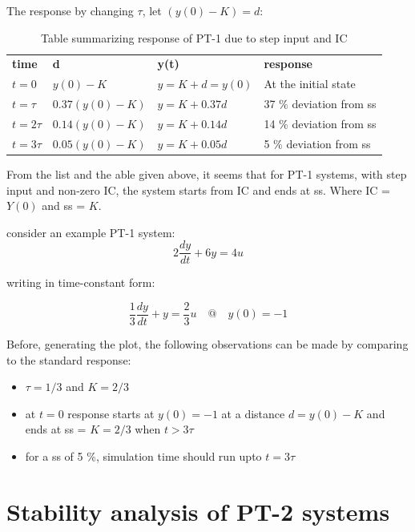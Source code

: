 The response by changing $\tau$, let $(y(0) - K) = d$:

\begin{table}[h!]
	\centering
	\begin{tabular}{m{2cm} m{2cm} m{3cm} m{5cm}}
		\toprule
		\textbf{time} & \textbf{d}  & \textbf{y(t)} & \textbf{response} \\
		\cmidrule{1-4}
		\cmidrule{1-4}
		$t = 0$ & $ y(0) - K $ & $y = K + d = y(0)$ & At the initial state \\ \cmidrule{1-4}
		$t =  \tau$ & $ 0.37(y(0) - K) $ & $y = K + 0.37d$ & 37 $\%$ deviation from ss \\ \cmidrule{1-4}
		$t = 2 \tau$ & $ 0.14(y(0) - K) $ & $y = K + 0.14d$ & 14 $\%$ deviation from ss \\ \cmidrule{1-4}
		$t = 3 \tau$ & $ 0.05(y(0) - K) $ & $y = K + 0.05d$ & 5 $\%$ deviation from ss \\
		\bottomrule
	\end{tabular}
	\caption{Table summarizing response of PT-1 due to step input and IC}
\end{table}

From the list and the able given above, it seems that for PT-1 systems, with step input and non-zero IC, the system starts from IC and ends at ss. Where IC = $Y(0)$ and ss = $K$. 

consider an example PT-1 system:
\begin{equation}
	2 \frac{dy}{dt} + 6 y = 4 u
\end{equation}

writing in time-constant form:

\begin{equation}
	\frac{1}{3} \frac{dy}{dt} + y = \frac{2}{3} u \quad @ \quad y(0) = -1
\end{equation}

Before, generating the plot, the following observations can be made by comparing to the standard response:
\begin{itemize}
	\item $\tau = 1/3$ and $K = 2/3$
	\item at $t = 0$ response starts at $y(0) = -1$ at a distance $d = y(0) - K$ and ends at ss = $K = 2/3$ when $t > 3 \tau$
	\item for a ss of 5 $\%$, simulation time should run upto $t = 3 \tau$
\end{itemize}

\section{Stability analysis of PT-2 systems}

